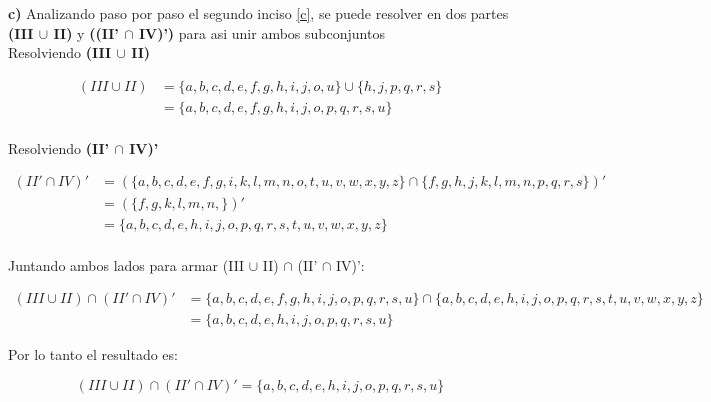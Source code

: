 \newpage

\textbf{c)} Analizando paso por paso el segundo inciso \ref{c}, se puede resolver en dos partes \textbf{(III $\cup$ II)} y \textbf{((II' $\cap$ IV)')} para asi unir ambos subconjuntos \\

Resolviendo \textbf{(III $\cup$ II)}

\begin{align*}
(III \cup II)  &= \{ a, b, c, d, e, f, g, h, i, j, o, u  \}   \cup \{ h, j, p, q, r, s  \} \\
  &=  \{ a, b, c, d, e, f, g, h, i, j, o, p, q, r, s, u  \}        \\
\end{align*}

Resolviendo \textbf{(II' $\cap$ IV)'}

\begin{align*}
(II' \cap IV)'  &=  (\{ a, b, c, d, e, f, g, i, k, l, m, n, o, t, u, v, w, x, y, z \} \cap \{ f, g, h, j, k, l, m, n, p, q, r, s  \} )' \\
  &=  (\{  f, g, k, l, m, n, \} )' \\
  &= \{ a, b, c, d, e, h, i, j, o, p, q, r, s, t, u, v, w, x, y, z \} \\
\end{align*}

Juntando ambos lados para armar (III $\cup$ II) $\cap$ (II' $\cap$ IV)':

\begin{align*}
(III \cup II) \cap (II' \cap IV)' &= \{ a, b, c, d, e, f, g, h, i, j, o, p, q, r, s, u  \} \cap \{ a, b, c, d, e, h, i, j, o, p, q, r, s, t, u, v, w, x, y, z \}\\
  &= \{ a, b, c, d, e, h, i, j, o, p, q, r, s, u \}
\end{align*}

Por lo tanto el resultado es:

\begin{equation*}
    \boxed{ (III \cup II) \cap (II' \cap IV)' =  \{ a, b, c, d, e, h, i, j, o, p, q, r, s, u \}    }
\end{equation*}